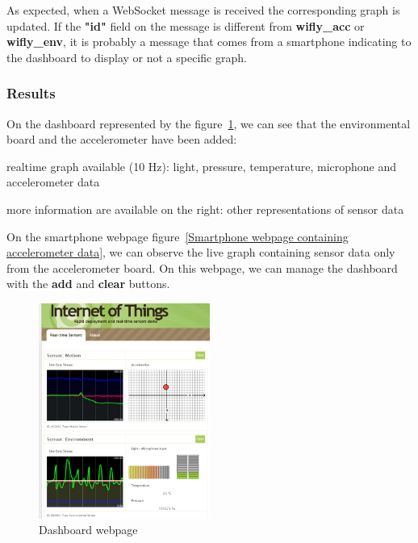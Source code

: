 \documentclass[pdftex,10pt,a4paper]{report}
\newenvironment{packed_item}{
\begin{itemize}
  \setlength{\itemsep}{1pt}
  \setlength{\parskip}{0pt}
  \setlength{\parsep}{0pt}
}{\end{itemize}}
\begin{document}
As expected, when a WebSocket message is received the corresponding graph is updated. If the \textbf{"id"} field on the message is different from \textbf{wifly\_acc} or \textbf{wifly\_env}, it is probably a message that comes from a smartphone indicating to the dashboard to display or not a specific graph. 

\subsubsection{Results}

On the dashboard represented by the figure~\ref{Dashboard webpage}, we can see that the environmental board and the accelerometer have been added:
\begin{packed_item}
	\item realtime graph available (10 Hz): light, pressure, temperature, microphone and accelerometer data
	\item more information are available on the right: other representations of sensor data
\end{packed_item}

On the smartphone webpage figure~\ref{Smartphone webpage containing accelerometer data}, we can observe the live graph containing sensor data only from the accelerometer board. On this webpage, we can manage the dashboard with the \textbf{add} and \textbf{clear} buttons.

\begin{figure}[h!]
		\centering
		\includegraphics[width=0.5\textwidth]{./dashboard_acc_env.jpg}
		\caption{Dashboard webpage}
		\label{Dashboard webpage}
\end{figure}
\end{document}
